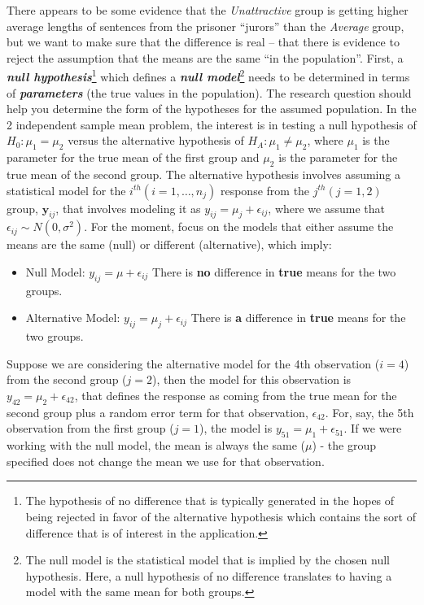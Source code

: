 \documentclass[]{book}
\let\rmarkdownfootnote\footnote%
\def\footnote{\protect\rmarkdownfootnote}
\begin{document}
There appears to be some evidence that the \emph{Unattractive} group is
getting higher average lengths of sentences from the prisoner ``jurors''
than the \emph{Average} group, but we want to make sure that the
difference is real -- that there is evidence to reject the assumption
that the means are the same ``in the population''. First, a
\textbf{\emph{null hypothesis}}\footnote{The hypothesis of no difference
  that is typically generated in the hopes of being rejected in favor of
  the alternative hypothesis which contains the sort of difference that
  is of interest in the application.} which defines a \textbf{\emph{null
model}}\footnote{The null model is the statistical model that is implied
  by the chosen null hypothesis. Here, a null hypothesis of no
  difference translates to having a model with the same mean for both
  groups.} needs to be determined in terms of \textbf{\emph{parameters}}
(the true values in the population). The research question should help
you determine the form of the hypotheses for the assumed population. In
the 2 independent sample mean problem, the interest is in testing a null
hypothesis of \(H_0: \mu_1 = \mu_2\) versus the alternative hypothesis
of \(H_A: \mu_1 \ne \mu_2\), where \(\mu_1\) is the parameter for the
true mean of the first group and \(\mu_2\) is the parameter for the true
mean of the second group. The alternative hypothesis involves assuming a
statistical model for the \(i^{th} (i=1,\ldots,n_j)\) response from the
\(j^{th} (j=1,2)\) group, \(\boldsymbol{y}_{ij}\), that involves
modeling it as \(y_{ij} = \mu_j + \epsilon_{ij}\), where we assume that
\(\epsilon_{ij} \sim N(0,\sigma^2)\). For the moment, focus on the
models that either assume the means are the same (null) or different
(alternative), which imply:

\begin{itemize}
\item
  Null Model: \(y_{ij} = \mu + \epsilon_{ij}\) There is \textbf{no}
  difference in \textbf{true} means for the two groups.
\item
  Alternative Model: \(y_{ij} = \mu_j + \epsilon_{ij}\) There is
  \textbf{a} difference in \textbf{true} means for the two groups.
\end{itemize}

Suppose we are considering the alternative model for the 4th observation
(\(i=4\)) from the second group (\(j=2\)), then the model for this
observation is \(y_{42} = \mu_2 +\epsilon_{42}\), that defines the
response as coming from the true mean for the second group plus a random
error term for that observation, \(\epsilon_{42}\). For, say, the 5th
observation from the first group (\(j=1\)), the model is
\(y_{51} = \mu_1 +\epsilon_{51}\). If we were working with the null
model, the mean is always the same (\(\mu\)) - the group specified does
not change the mean we use for that observation.
\end{document}
